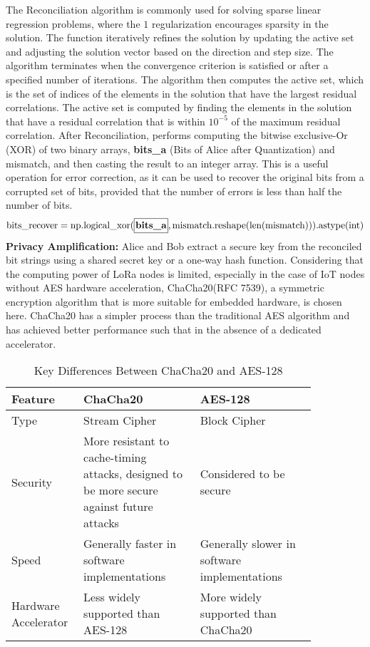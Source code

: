 The Reconciliation algorithm is commonly used for solving sparse linear regression problems, where the \ell\(1\) regularization encourages sparsity in the solution. The function iteratively refines the solution by updating the active set and adjusting the solution vector based on the direction and step size. The algorithm terminates when the convergence criterion is satisfied or after a specified number of iterations.
The algorithm then computes the active set, which is the set of indices of the elements in the solution that have the largest residual correlations. The active set is computed by finding the elements in the solution that have a residual correlation that is within \(10^{-5}\) of the maximum residual correlation.
After Reconciliation, performs computing the bitwise exclusive-Or (XOR) of two binary arrays, \textbf{bits\_a} (Bits of Alice after Quantization) and mismatch, and then casting the result to an integer array. This is a useful operation for error correction, as it can be used to recover the original bits from a corrupted set of bits, provided that the number of errors is less than half the number of bits. 
  \[
  \text{{bits\_recover}} = \text{{np.logical\_xor}}(\textbf{\framebox[1.1\width]{{bits\_a}}}, \text{{mismatch}}.\text{{reshape}}(\text{{len}}(\text{{mismatch}}))).\text{{astype(int)}}
  \]
\textbf{Privacy Amplification:} Alice and Bob extract a secure key from the reconciled bit strings using a shared secret key or a one-way hash function. Considering that the computing power of LoRa nodes is limited, especially in the case of IoT nodes without AES hardware acceleration, ChaCha20(RFC 7539)\cite{rfc7539}, a symmetric encryption algorithm that is more suitable for embedded hardware, is chosen here. ChaCha20 has a simpler process than the traditional AES algorithm and has achieved better performance such that in the absence of a dedicated accelerator\cite{7507408,7927078}.
\begin{table}
    \centering
    \caption{Key Differences Between ChaCha20 and AES-128}
    \begin{tabular}{p{0.15\linewidth}p{0.35\linewidth}p{0.35\linewidth}}
      \toprule
      Feature&ChaCha20&AES-128\\
      \midrule
      Type&Stream Cipher&Block Cipher\\
      Security&More resistant to cache-timing attacks, designed to be more secure against future attacks&Considered to be secure\\
      Speed&Generally faster in software implementations&Generally slower in software implementations\\
      Hardware Accelerator&Less widely supported than AES-128&More widely supported than ChaCha20    \\
      \bottomrule
    \end{tabular}
    \label{tab:comparisonaeschacha}
\end{table}
